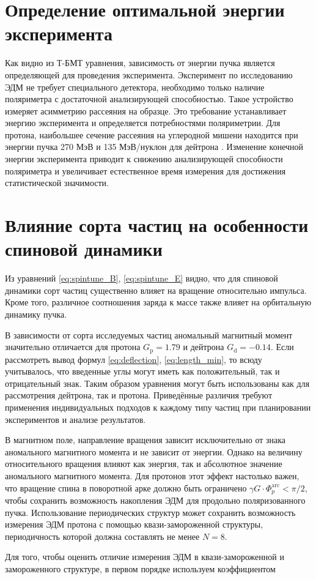 	\section{Определение оптимальной энергии эксперимента}\label{sec:EDM/requirements/energy}
\par Как видно из Т-БМТ уравнения, зависимость от энергии пучка является определяющей для проведения эксперимента. Эксперимент по исследованию ЭДМ не требует специального детектора, необходимо только наличие поляриметра с достаточной анализирующей способностью. Такое устройство измеряет асимметрию рассеяния на образце. Это требование устанавливает энергию эксперимента и определяется потребностями поляриметрии. Для протона, наибольшее сечение рассеяния на углеродной мишени находится при энергии пучка 270 МэВ и 135 МэВ/нуклон для дейтрона \cite{JEDI:polarimeter, skhomenko:polarimeter}. Изменение конечной энергии эксперимента приводит к снижению анализирующей способности поляриметра и увеличивает естественное время измерения для достижения статистической значимости.

	\section{Влияние сорта частиц на особенности спиновой динамики}\label{sec:EDM/requirements/particles}

\par Из уравнений \ref{eq:spintune_B}, \ref{eq:spintune_E} видно, что для спиновой динамики сорт частиц существенно влияет на вращение относительно импульса. Кроме того, различное соотношения заряда к массе также влияет на орбитальную динамику пучка.

\par В зависимости от сорта исследуемых частиц аномальный магнитный момент значительно отличается для протона $G_{\textrm{p}}=1.79$ и дейтрона $G_{\textrm{d}}=-0.14$. Если рассмотреть вывод формул \ref{eq:deflection}, \ref{eq:length_min}, то всюду учитывалось, что введенные углы могут иметь как положительный, так и отрицательный знак. Таким образом уравнения могут быть использованы как для рассмотрения дейтрона, так и протона. Приведённые различия требуют применения индивидуальных подходов к каждому типу частиц при планировании экспериментов и анализе результатов.

\par  В магнитном поле, направление вращения зависит исключительно от знака аномального магнитного момента и не зависит от энергии. Однако на величину относительного вращения влияют как энергия, так и абсолютное значение аномального магнитного момента. Для протонов этот эффект настолько важен, что вращение спина в поворотной арке должно быть ограничено $\gamma G \cdot \Phi_{p}^{\text{arc}} < \pi/2$, чтобы сохранить возможность накопления ЭДМ для продольно поляризованного пучка. Использование периодических структур может сохранить возможность измерения ЭДМ протона с помощью квази-замороженной структуры, периодичность которой должна составлять не менее $N=8$.
\par Для того, чтобы оценить отличие измерения ЭДМ в квази-замороженной и замороженного структуре, в первом порядке используем коэффициентом \cite{Senichev:2023_nuclotron} 

